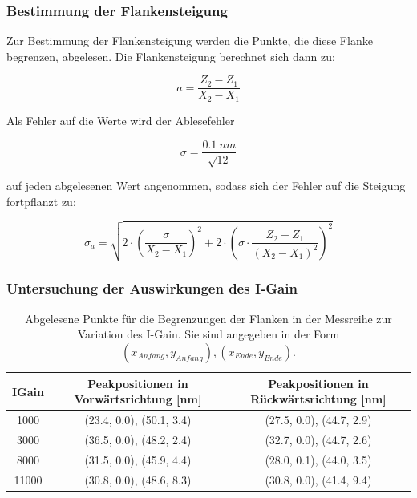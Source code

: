 \documentclass[12pt,a4paper]{article}
\begin{document}
\subsubsection{Bestimmung der Flankensteigung}
Zur Bestimmung der Flankensteigung werden die Punkte, die diese Flanke begrenzen, abgelesen.
Die Flankensteigung berechnet sich dann zu:

\begin{equation*}
a = \dfrac{Z_2 - Z_1}{X_2 - X_1}
\end{equation*}

Als Fehler auf die Werte wird der Ablesefehler

\begin{equation*}
\sigma = \dfrac{\SI{0.1}{nm}}{\sqrt{12}}
\end{equation*}

auf jeden abgelesenen Wert angenommen, sodass sich der Fehler auf die Steigung fortpflanzt zu:

\begin{equation*}
\sigma _a = \sqrt{2 \cdot \left( \dfrac{\sigma}{X_2 - X_1} \right) ^2 + 2 \cdot \left( \sigma \cdot  \dfrac{Z_2 - Z_1}{(X_2 - X_1)^2} \right) ^2}
\end{equation*}


\subsubsection{Untersuchung der Auswirkungen des I-Gain}

\begin{table}
\centering
\begin{tabular}{|c|c|c|}
\hline 
IGain & Peakpositionen in Vorwärtsrichtung [nm] & Peakpositionen in Rückwärtsrichtung [nm] \\ 
\hline 
1000 & (23.4, 0.0), (50.1, 3.4) & (27.5, 0.0), (44.7, 2.9) \\
\hline 
3000 & (36.5, 0.0), (48.2, 2.4) & (32.7, 0.0), (44.7, 2.6) \\ 
\hline 
8000 & (31.5, 0.0), (45.9, 4.4) & (28.0, 0.1), (44.0, 3.5) \\
\hline 
11000 & (30.8, 0.0), (48.6, 8.3) & (30.8, 0.0), (41.4, 9.4) \\
\hline 
\end{tabular} 
\caption{Abgelesene Punkte für die Begrenzungen der Flanken in der Messreihe zur Variation des I-Gain. Sie sind angegeben in der Form $(x_{Anfang},y_{Anfang}),(x_{Ende},y_{Ende})$.}
\label{tab:Peaks_IGain}
\end{table}
\end{document}
